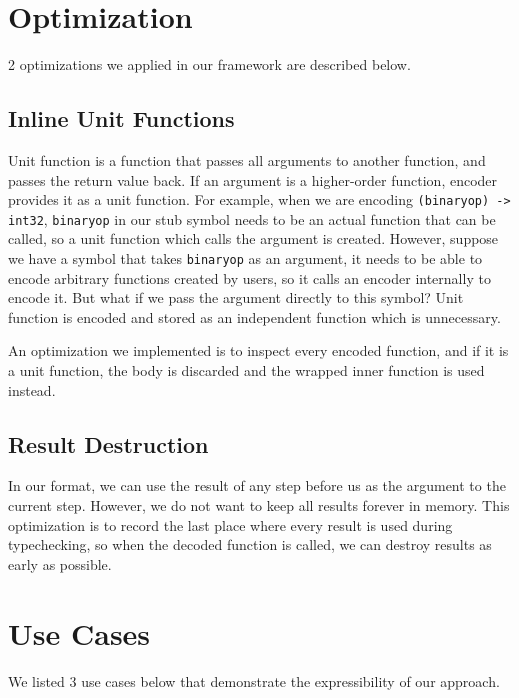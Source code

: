 \documentclass[12pt]{article}
\begin{document}
\section{Optimization}
2 optimizations we applied in our framework are described below.

\subsection{Inline Unit Functions}
Unit function is a function that passes all arguments to another function, and passes the return value back. If an argument is a higher-order function, encoder provides it as a unit function. For example, when we are encoding \texttt{(binaryop) -> int32}, \texttt{binaryop} in our stub symbol needs to be an actual function that can be called, so a unit function which calls the argument is created. However, suppose we have a symbol that takes \texttt{binaryop} as an argument, it needs to be able to encode arbitrary functions created by users, so it calls an encoder internally to encode it. But what if we pass the argument directly to this symbol? Unit function is encoded and stored as an independent function which is unnecessary.

An optimization we implemented is to inspect every encoded function, and if it is a unit function, the body is discarded and the wrapped inner function is used instead.

\subsection{Result Destruction}
In our format, we can use the result of any step before us as the argument to the current step. However, we do not want to keep all results forever in memory. This optimization is to record the last place where every result is used during typechecking, so when the decoded function is called, we can destroy results as early as possible.

\section{Use Cases}
We listed 3 use cases below that demonstrate the expressibility of our approach.
\end{document}
